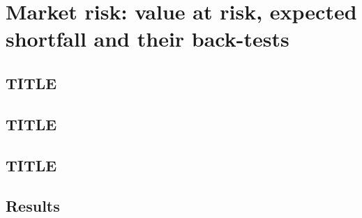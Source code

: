 \chapter{Market risk: value at risk, expected shortfall and their back-tests}
\label{ch:market}


\section{TITLE}
\label{sec:m18}


\section{TITLE}
\label{sec:m19}


\section{TITLE}
\label{sec:m30}


\section{Results}
\label{sec:results-market}

